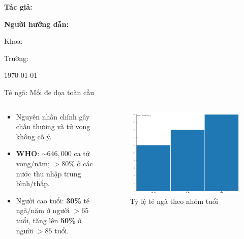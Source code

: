 
\begin{frame}
    \titlepage
\end{frame}

\begin{frame}
    \centering
    {\Large \textbf{Tác giả:} \TENTACGIA \par}
    {\Large \textbf{Người hướng dẫn:} \TENNGUOIHUONGDAN \par}
    \vspace{0.5cm}
    {\small Khoa: \KHOA \par}
    {\small Trường: \TRUONG \par}
    \vfill
    {\footnotesize \today}
\end{frame}

\begin{frame}{Té ngã: Mối đe dọa toàn cầu}
    \begin{columns}[T]
        \begin{column}{0.48\textwidth}
            \begin{itemize}
                \item Nguyên nhân chính gây chấn thương và tử vong không cố ý.
                \item \textbf{WHO}: $\sim646,000$ ca tử vong/năm; $>80\%$ ở các nước thu nhập trung bình/thấp.
                \item Người cao tuổi: \textbf{30\%} té ngã/năm ở người $>65$ tuổi, tăng lên \textbf{50\%} ở người $>85$ tuổi.
            \end{itemize}
        \end{column}
        \begin{column}{0.48\textwidth}
            \begin{figure}
                \centering
                \includegraphics[width=\textwidth]{images/fall_status_who.png}
                \caption{Tỷ lệ té ngã theo nhóm tuổi}
            \end{figure}
        \end{column}
    \end{columns}
\end{frame}

